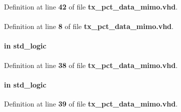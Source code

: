 Definition at line {\bf 42} of file {\bf tx\+\_\+pct\+\_\+data\+\_\+mimo.\+vhd}.

\paragraph[{ieee}]{\hspace{0.3cm}{\ttfamily [Library]}}\label{classtx__pct__data__mimo_a0a6af6eef40212dbaf130d57ce711256}


Definition at line {\bf 8} of file {\bf tx\+\_\+pct\+\_\+data\+\_\+mimo.\+vhd}.

\paragraph[{lte\+\_\+synch\+\_\+dis}]{ {\bfseries \textcolor{keywordflow}{in}\textcolor{vhdlchar}{ }} {\bfseries \textcolor{comment}{std\+\_\+logic}\textcolor{vhdlchar}{ }} \hspace{0.3cm}{\ttfamily [Port]}}\label{classtx__pct__data__mimo_aeefa4410f3020e7e1a83111bbfe88fc7}


Definition at line {\bf 38} of file {\bf tx\+\_\+pct\+\_\+data\+\_\+mimo.\+vhd}.

\paragraph[{mimo\+\_\+en}]{ {\bfseries \textcolor{keywordflow}{in}\textcolor{vhdlchar}{ }} {\bfseries \textcolor{comment}{std\+\_\+logic}\textcolor{vhdlchar}{ }} \hspace{0.3cm}{\ttfamily [Port]}}\label{classtx__pct__data__mimo_a0c57670aee4f9fbfa3c286573012965a}


Definition at line {\bf 39} of file {\bf tx\+\_\+pct\+\_\+data\+\_\+mimo.\+vhd}.

